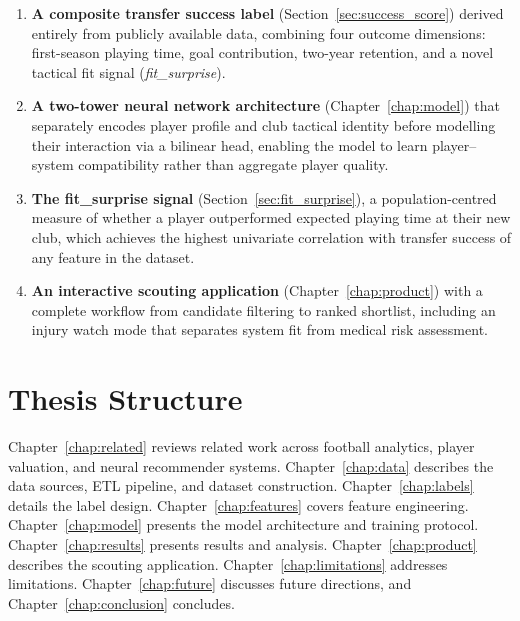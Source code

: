 \documentclass[12pt, a4paper, oneside]{report}
\begin{document}
\begin{enumerate}[leftmargin=2em]
    \item \textbf{A composite transfer success label} (Section~\ref{sec:success_score}) derived entirely from publicly available data, combining four outcome dimensions: first-season playing time, goal contribution, two-year retention, and a novel tactical fit signal (\textit{fit\_surprise}).

    \item \textbf{A two-tower neural network architecture} (Chapter~\ref{chap:model}) that separately encodes player profile and club tactical identity before modelling their interaction via a bilinear head, enabling the model to learn player--system compatibility rather than aggregate player quality.

    \item \textbf{The fit\_surprise signal} (Section~\ref{sec:fit_surprise}), a population-centred measure of whether a player outperformed expected playing time at their new club, which achieves the highest univariate correlation with transfer success of any feature in the dataset.

    \item \textbf{An interactive scouting application} (Chapter~\ref{chap:product}) with a complete workflow from candidate filtering to ranked shortlist, including an injury watch mode that separates system fit from medical risk assessment.
\end{enumerate}

\section{Thesis Structure}

Chapter~\ref{chap:related} reviews related work across football analytics, player valuation, and neural recommender systems. Chapter~\ref{chap:data} describes the data sources, ETL pipeline, and dataset construction. Chapter~\ref{chap:labels} details the label design. Chapter~\ref{chap:features} covers feature engineering. Chapter~\ref{chap:model} presents the model architecture and training protocol. Chapter~\ref{chap:results} presents results and analysis. Chapter~\ref{chap:product} describes the scouting application. Chapter~\ref{chap:limitations} addresses limitations. Chapter~\ref{chap:future} discusses future directions, and Chapter~\ref{chap:conclusion} concludes.

\end{document}
